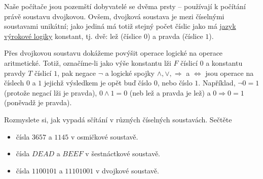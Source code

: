 Naše počítače jsou pozemští dobyvatelé se dvěma prsty -- používají k počítání
právě soustavu dvojkovou. Ovšem, dvojková soustava je mezi číselnými soustavami
unikátní; jako jediná má totiž stejný počet číslic jako má
\hyperref[def:vyrokova-logika]{jazyk výrokové logiky} konstant, tj. dvě: lež
(číslice $0$) a pravda (číslice $1$).

Přes dvojkovou soustavu dokážeme povýšit operace logické na operace aritmetické.
Totiž, označíme-li jako výše konstantu lži $F$ číslicí $0$ a konstantu pravdy
$T$ číslicí $1$, pak negace $\neg $ a logické spojky $ \wedge , \vee,
\Rightarrow$ a $ \Leftrightarrow $ jsou operace na číslech $0$ a $1$ jejichž
výsledkem je opět buď číslo $0$, nebo číslo $1$. Například, $\neg 0 = 1$
(protože negací lži je pravda), $0 \wedge 1 = 0$ (neb lež a pravda je lež) a
$0 \Rightarrow 0 = 1$ (poněvadž  je pravda).

\begin{exercise}
  Rozmyslete si, jak vypadá sčítání v různých číselných soustavách. Sečtěte
  \begin{itemize}
    \item čísla $3657$ a $1145$ v osmičkové soustavě.
    \item čísla $DEAD$ a $BEEF$ v šestnáctkové soustavě.
    \item čísla $1100101$ a $11101001$ v dvojkové soustavě.
  \end{itemize}
\end{exercise}
